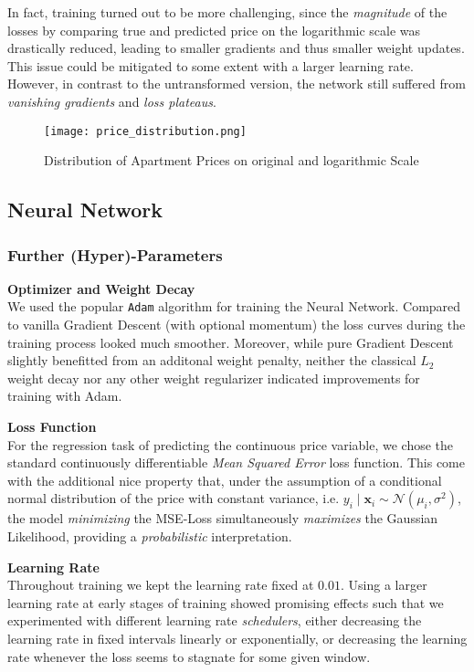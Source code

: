 In fact, training turned out to be more challenging, since the \emph{magnitude} of the losses by comparing true and predicted price on the logarithmic scale was drastically reduced, leading to smaller gradients and thus smaller weight updates.
This issue could be mitigated to some extent with a larger learning rate.
However, in contrast to the untransformed version, the network still suffered from \emph{vanishing gradients} and \emph{loss plateaus}.

\begin{figure}[ht]
    \centering
    \texttt{[image: price\_distribution.png]}
    \caption{Distribution of Apartment Prices on original and logarithmic Scale}
    \label{fig:price-distribution}
\end{figure}


\subsection{Neural Network}

\subsubsection{Further (Hyper)-Parameters} \label{appendix:hyperparameters}

\textbf{Optimizer and Weight Decay} \\
We used the popular \texttt{Adam} algorithm \citep{kingma2017} for training the Neural Network.
Compared to vanilla Gradient Descent (with optional momentum) the loss curves during the training process looked much smoother.
Moreover, while pure Gradient Descent slightly benefitted from an additonal weight penalty, neither the classical $L_2$ weight decay nor any other weight regularizer indicated improvements for training with Adam.

\textbf{Loss Function} \\
For the regression task of predicting the continuous price variable, we chose the standard continuously differentiable \emph{Mean Squared Error} loss function.
This come with the additional nice property that, under the assumption of a conditional normal distribution of the price with constant variance, i.e. $y_i \mid \mathbf{x}_i \sim \mathcal{N} \left(\mu_i, \sigma^2 \right)$, the model \emph{minimizing} the MSE-Loss simultaneously \emph{maximizes} the Gaussian Likelihood, providing a \emph{probabilistic} interpretation.

\textbf{Learning Rate} \\
Throughout training we kept the learning rate fixed at $0.01$.
Using a larger learning rate at early stages of training showed promising effects such that we experimented with different learning rate \emph{schedulers}, either decreasing the learning rate in fixed intervals linearly or exponentially, or decreasing the learning rate whenever the loss seems to stagnate for some given window.

